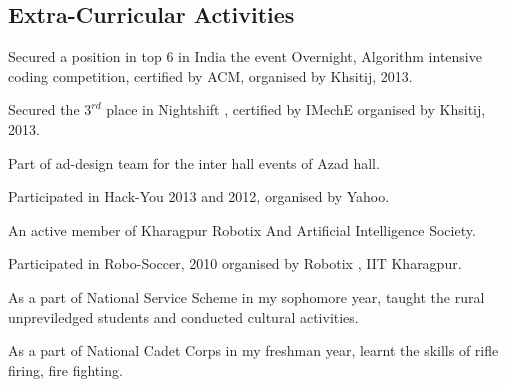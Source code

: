 \documentclass[hidelinks,margin,line,10pt,a4paper]{resume}
\begin{document}
\begin{resume}


    \section{\mysidestyle Extra-Curricular Activities} 
\begin{list2}
\item Secured a position in top 6 in India the event Overnight, Algorithm intensive coding competition, certified by ACM, organised by Khsitij, 2013.   \vspace{1mm}%
\item Secured the $3^{rd}$ place in Nightshift , certified by IMechE organised by Khsitij, 2013.   \vspace{1mm}%
\item Part of ad-design team for the inter hall events of Azad hall. \vspace{1mm}%
\item Participated in Hack-You 2013 and 2012, organised by Yahoo.    \vspace{1mm}%
\item An active member of Kharagpur Robotix And Artificial Intelligence Society. \vspace{1mm}%
\item Participated in Robo-Soccer, 2010 organised by Robotix , IIT Kharagpur. \vspace{1mm}%
\item As a part of National Service Scheme in my sophomore year, taught the rural unpreviledged students and conducted cultural activities.\vspace{1mm}%
\item As a part of National Cadet Corps in my freshman year, learnt the skills of rifle firing, fire fighting.\vspace{1mm}%
\end{list2}


\end{resume}
\end{document}
